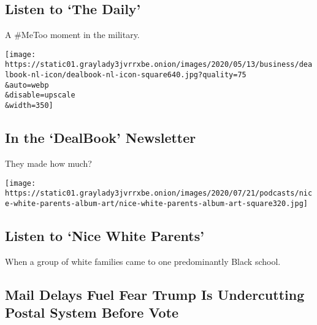 \href{/2020/07/31/podcasts/the-daily/vanessa-guillen-military-metoo.html}{}

\hypertarget{listen-to-the-daily}{%
\subsection{Listen to `The Daily'}\label{listen-to-the-daily}}

A \#MeToo moment in the military.

\href{/2020/07/31/business/dealbook/tech-earnings-economy.html}{}

\texttt{[image: https://static01.graylady3jvrrxbe.onion/images/2020/05/13/business/dealbook-nl-icon/dealbook-nl-icon-square640.jpg?quality=75\\\&auto=webp\\\&disable=upscale\\\&width=350]}

\href{/2020/07/31/business/dealbook/tech-earnings-economy.html}{}

\hypertarget{in-the-dealbook-newsletter}{%
\subsection{In the `DealBook'
Newsletter}\label{in-the-dealbook-newsletter}}

They made how much?

\href{/2020/07/30/podcasts/nice-white-parents-serial.html}{}

\texttt{[image: https://static01.graylady3jvrrxbe.onion/images/2020/07/21/podcasts/nice-white-parents-album-art/nice-white-parents-album-art-square320.jpg]}

\href{/2020/07/30/podcasts/nice-white-parents-serial.html}{}

\hypertarget{listen-to-nice-white-parents}{%
\subsection{Listen to `Nice White
Parents'}\label{listen-to-nice-white-parents}}

When a group of white families came to one predominantly Black school.

\href{/2020/07/31/us/politics/trump-usps-mail-delays.html}{}

\hypertarget{mail-delays-fuel-fear-trump-is-undercutting-postal-system-before-vote}{%
\subsection{Mail Delays Fuel Fear Trump Is Undercutting Postal System
Before
Vote}\label{mail-delays-fuel-fear-trump-is-undercutting-postal-system-before-vote}}

